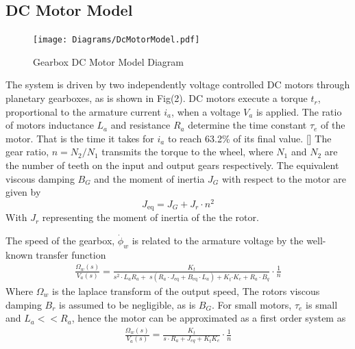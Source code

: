     \subsection{DC Motor Model}    
    \begin{figure}[H]
        \centering
            \texttt{[image: Diagrams/DcMotorModel.pdf]}
        \caption{Gearbox DC Motor Model Diagram}
    \end{figure}
    The system is driven by two independently voltage controlled DC motors through 
    planetary gearboxes, as is shown in Fig(2). 
    DC motors execute a torque $t_r$, proportional to the armature current $i_a$,
    when a voltage $V_a$ is applied.
    The ratio of motors inductance $L_a$ and resistance $R_a$ determine the
    time constant $\tau_e$ of the motor. That is the time it takes 
    for $i_a$ to reach 63.2\% of its final value. []
    The gear ratio, $n=N_2/N_1$ transmits the torque to the wheel, 
    where $N_1$ and $N_2$ are the number of teeth on the input and output gears respectively.
    The equivalent viscous damping 
    $B_G$ and the moment of inertia $J_G$ with respect to the motor are given by
    \begin{equation}
        J_{\text{eq}} = J_G + J_r \cdot n^2 
    \end{equation}
    With $J_r$ representing the moment of inertia of the the rotor.

    The speed of the gearbox, $\dot\phi_w$ is related to the armature voltage 
    by the well-known transfer function
    \begin{equation}
        \begin{aligned}
            \frac{\Omega_w \left(s\right)}{V_a \left(s\right)}=\frac{K_t }{s^2 \cdot L_a R_a +\;s\left(R_a \cdot J_{\mathrm{eq}} +B_{\mathrm{eq}} \cdot L_a \right)+K_t {\cdot K}_e +R_a \cdot B_q }\cdot\frac{1}{n}
        \end{aligned}
        \label{eq:DCMotor}
    \end{equation}
    Where $\Omega_w$ is the laplace transform of the output speed, 
    The rotors viscous damping $B_r$ is assumed to be negligible, as is $B_G$. 
    For small motors, $\tau_e$ is small and $L_a << R_a$, hence the motor can be 
    approximated as a first order system as
    \begin{equation}
        \begin{aligned}
            \frac{\Omega_w \left(s\right)}{V_a \left(s\right)}=\frac{K_t }{s\cdot R_a + J_{eq}+K_t K_e }\cdot\frac{1}{n}
        \end{aligned}
        \label{eq:DCMotorSimple}
    \end{equation}

